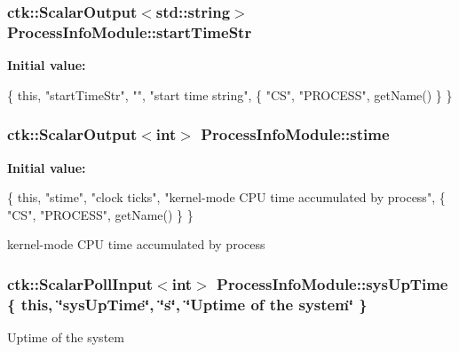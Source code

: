 \subsubsection[{\texorpdfstring{start\+Time\+Str}{startTimeStr}}]{\setlength{\rightskip}{0pt plus 5cm}ctk\+::\+Scalar\+Output$<$std\+::string$>$ Process\+Info\+Module\+::start\+Time\+Str}\hypertarget{structProcessInfoModule_a9e077650b12f3f7c7a0af1c304c1b8dd}{}\label{structProcessInfoModule_a9e077650b12f3f7c7a0af1c304c1b8dd}
{\bfseries Initial value\+:}
\begin{DoxyCode}
\{ \textcolor{keyword}{this}, \textcolor{stringliteral}{"startTimeStr"}, \textcolor{stringliteral}{""}, \textcolor{stringliteral}{"start time string"},
      \{ \textcolor{stringliteral}{"CS"}, \textcolor{stringliteral}{"PROCESS"}, getName() \} \}
\end{DoxyCode}
\subsubsection[{\texorpdfstring{stime}{stime}}]{\setlength{\rightskip}{0pt plus 5cm}ctk\+::\+Scalar\+Output$<$int$>$ Process\+Info\+Module\+::stime}\hypertarget{structProcessInfoModule_ac56fdecfc319beb99b6664a258d1bc4d}{}\label{structProcessInfoModule_ac56fdecfc319beb99b6664a258d1bc4d}
{\bfseries Initial value\+:}
\begin{DoxyCode}
\{ \textcolor{keyword}{this}, \textcolor{stringliteral}{"stime"}, \textcolor{stringliteral}{"clock ticks"}, \textcolor{stringliteral}{"kernel-mode CPU time accumulated by process"},
    \{ \textcolor{stringliteral}{"CS"}, \textcolor{stringliteral}{"PROCESS"}, getName() \} \}
\end{DoxyCode}
kernel-\/mode C\+PU time accumulated by process 
\subsubsection[{\texorpdfstring{sys\+Up\+Time}{sysUpTime}}]{\setlength{\rightskip}{0pt plus 5cm}ctk\+::\+Scalar\+Poll\+Input$<$int$>$ Process\+Info\+Module\+::sys\+Up\+Time \{ this, \char`\"{}sys\+Up\+Time\char`\"{}, \char`\"{}s\char`\"{}, \char`\"{}Uptime of the system\char`\"{} \}}\hypertarget{structProcessInfoModule_af7b86dd5c8d50168f7d64ed21ddd48e7}{}\label{structProcessInfoModule_af7b86dd5c8d50168f7d64ed21ddd48e7}
Uptime of the system 
